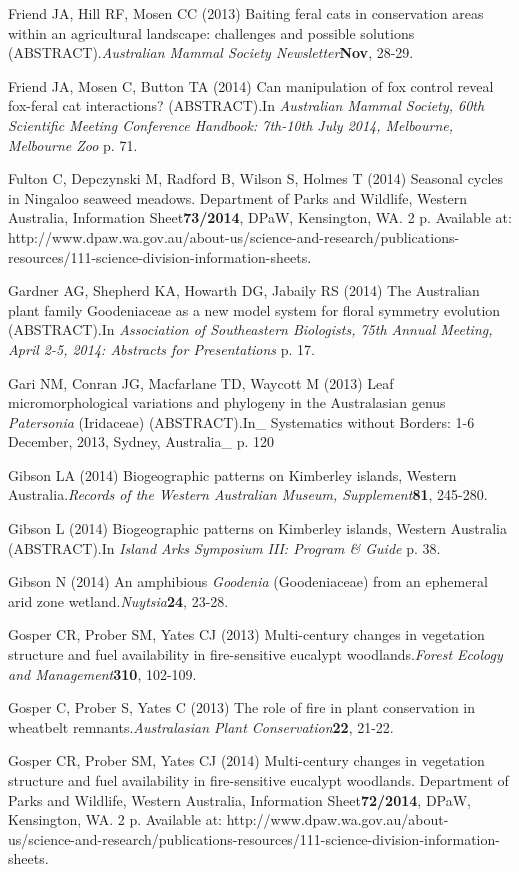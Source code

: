 \documentclass[version=last, paper=a4, DIV=18, usenames, dvipsnames]{scrartcl}
\begin{document}
Friend JA, Hill RF, Mosen CC (2013) Baiting feral cats in conservation areas within an agricultural landscape: challenges and possible solutions (ABSTRACT).\emph{Australian Mammal Society Newsletter}\textbf{Nov}, 28-29.


Friend JA, Mosen C, Button TA (2014) Can manipulation of fox control reveal fox-feral cat interactions? (ABSTRACT).In \emph{Australian Mammal Society, 60th Scientific Meeting Conference Handbook: 7th-10th July 2014, Melbourne, Melbourne Zoo} p. 71.


Fulton C, Depczynski M, Radford B, Wilson S, Holmes T (2014) Seasonal cycles in Ningaloo seaweed meadows. Department of Parks and Wildlife, Western Australia, Information Sheet\textbf{73/2014}, DPaW, Kensington, WA. 2 p. Available at: http://www.dpaw.wa.gov.au/about-us/science-and-research/publications-resources/111-science-division-information-sheets.


Gardner AG, Shepherd KA, Howarth DG, Jabaily RS (2014) The Australian plant family Goodeniaceae as a new model system for floral symmetry evolution (ABSTRACT).In \emph{Association of Southeastern Biologists, 75th Annual Meeting, April 2-5, 2014: Abstracts for Presentations} p. 17.


Gari NM, Conran JG, Macfarlane TD, Waycott M (2013) Leaf micromorphological variations and phylogeny in the Australasian genus \emph{Patersonia} (Iridaceae) (ABSTRACT).In_ Systematics without Borders: 1-6 December, 2013, Sydney, Australia_ p. 120


Gibson LA (2014) Biogeographic patterns on Kimberley islands, Western Australia.\emph{Records of the Western Australian Museum, Supplement}\textbf{81}, 245-280.


Gibson L (2014) Biogeographic patterns on Kimberley islands, Western Australia (ABSTRACT).In \emph{Island Arks Symposium III: Program \& Guide} p. 38.


Gibson N (2014) An amphibious \emph{Goodenia} (Goodeniaceae) from an ephemeral arid zone wetland.\emph{Nuytsia}\textbf{24}, 23-28.


Gosper CR, Prober SM, Yates CJ (2013) Multi-century changes in vegetation structure and fuel availability in fire-sensitive eucalypt woodlands.\emph{Forest Ecology and Management}\textbf{310}, 102-109.


Gosper C, Prober S, Yates C (2013) The role of fire in plant conservation in wheatbelt remnants.\emph{Australasian Plant Conservation}\textbf{22}, 21-22.


Gosper CR, Prober SM, Yates CJ (2014) Multi-century changes in vegetation structure and fuel availability in fire-sensitive eucalypt woodlands. Department of Parks and Wildlife, Western Australia, Information Sheet\textbf{72/2014}, DPaW, Kensington, WA. 2 p. Available at: http://www.dpaw.wa.gov.au/about-us/science-and-research/publications-resources/111-science-division-information-sheets.
\end{document}
